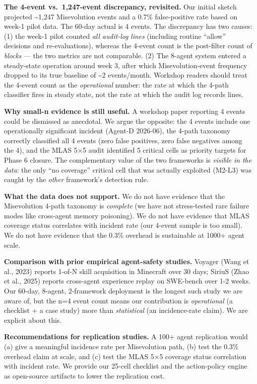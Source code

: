 \textbf{The 4-event vs.~1,247-event discrepancy, revisited.} Our initial
sketch projected \textasciitilde1,247 Misevolution events and a 0.7\%
false-positive rate based on week-1 pilot data. The 60-day actual is 4
events. The discrepancy has two causes: (1) the week-1 pilot counted
\emph{all audit-log lines} (including routine ``allow'' decisions and
re-evaluations), whereas the 4-event count is the post-filter count of
\emph{blocks} --- the two metrics are not comparable. (2) The 8-agent
system entered a steady-state operation around week 3, after which
Misevolution-event frequency dropped to its true baseline of
\textasciitilde2 events/month. Workshop readers should treat the 4-event
count as the \emph{operational} number: the rate at which the 4-path
classifier fires in steady state, not the rate at which the audit log
records lines.

\textbf{Why small-n evidence is still useful.} A workshop paper
reporting 4 events could be dismissed as anecdotal. We argue the
opposite: the 4 events include one operationally significant incident
(Agent-D 2026-06), the 4-path taxonomy correctly classified all 4 events
(zero false positives, zero false negatives among the 4), and the MLAS
5×5 audit identified 5 critical cells as priority targets for Phase 6
closure. The complementary value of the two frameworks is \emph{visible
in the data}: the only ``no coverage'' critical cell that was actually
exploited (M2-L3) was caught by the \emph{other} framework's detection
rule.

\textbf{What the data does not support.} We do not have evidence that
the Misevolution 4-path taxonomy is \emph{complete} (we have not
stress-tested rare failure modes like cross-agent memory poisoning). We
do not have evidence that MLAS coverage status correlates with incident
rate (our 4-event sample is too small). We do not have evidence that the
0.3\% overhead is sustainable at 1000+ agent scale.

\textbf{Comparison with prior empirical agent-safety studies.} Voyager
(Wang et al., 2023) reports 1-of-N skill acquisition in Minecraft over
30 days; SiriuS (Zhao et al., 2025) reports cross-agent experience
replay on SWE-bench over 1-2 weeks. Our 60-day, 8-agent, 2-framework
deployment is the longest such study we are aware of, but the n=4 event
count means our contribution is \emph{operational} (a checklist + a case
study) more than \emph{statistical} (an incidence-rate claim). We are
explicit about this.

\textbf{Recommendations for replication studies.} A 100+ agent
replication would (a) give a meaningful incidence rate per Misevolution
path, (b) test the 0.3\% overhead claim at scale, and (c) test the MLAS
5×5 coverage status correlation with incident rate. We provide our
25-cell checklist and the action-policy engine as open-source artifacts
to lower the replication cost.

